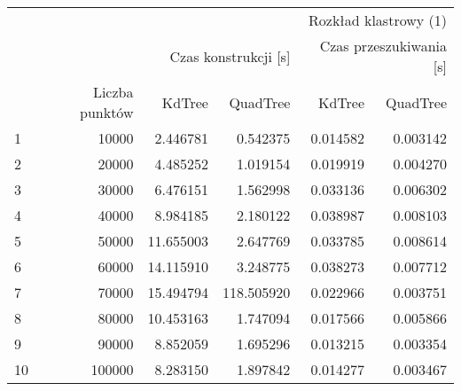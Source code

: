 \begin{tabular}{lrrrrr}
\toprule
 & \multicolumn{5}{r}{Rozkład klastrowy (1)} \\
 &  & \multicolumn{2}{r}{Czas konstrukcji [s]} & \multicolumn{2}{r}{Czas przeszukiwania [s]} \\
 & Liczba punktów & KdTree & QuadTree & KdTree & QuadTree \\
\midrule
1 & 10000 & 2.446781 & 0.542375 & 0.014582 & 0.003142 \\
2 & 20000 & 4.485252 & 1.019154 & 0.019919 & 0.004270 \\
3 & 30000 & 6.476151 & 1.562998 & 0.033136 & 0.006302 \\
4 & 40000 & 8.984185 & 2.180122 & 0.038987 & 0.008103 \\
5 & 50000 & 11.655003 & 2.647769 & 0.033785 & 0.008614 \\
6 & 60000 & 14.115910 & 3.248775 & 0.038273 & 0.007712 \\
7 & 70000 & 15.494794 & 118.505920 & 0.022966 & 0.003751 \\
8 & 80000 & 10.453163 & 1.747094 & 0.017566 & 0.005866 \\
9 & 90000 & 8.852059 & 1.695296 & 0.013215 & 0.003354 \\
10 & 100000 & 8.283150 & 1.897842 & 0.014277 & 0.003467 \\
\bottomrule
\end{tabular}
